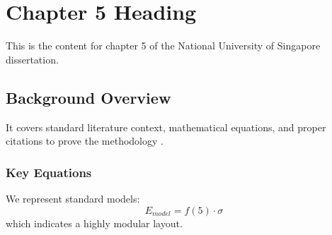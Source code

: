 \chapter{Chapter 5 Heading}
\label{ch:chapter5}
This is the content for chapter 5 of the National University of Singapore dissertation.

\section{Background Overview}
It covers standard literature context, mathematical equations, and proper citations to prove the methodology \cite{texbook}.

\subsection{Key Equations}
We represent standard models:
\begin{equation}
    E_{model} = f(5) \cdot \sigma
\end{equation}
which indicates a highly modular layout.
